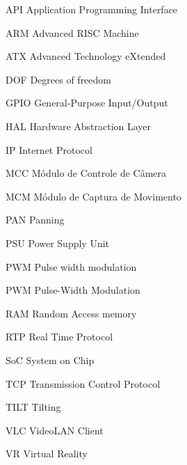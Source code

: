
\begin{siglas}
	\item[API]         Application Programming Interface
	\item[ARM]         Advanced RISC Machine
	\item[ATX]         Advanced Technology eXtended
	\item[DOF]         Degrees of freedom
	\item[GPIO]        General-Purpose Input/Output
	\item[HAL]         Hardware Abstraction Layer
	\item[IP]          Internet Protocol
	\item[MCC]         Módulo de Controle de Câmera
	\item[MCM]         Módulo de Captura de Movimento
	\item[PAN]         Panning
	\item[PSU]         Power Supply Unit
	\item[PWM]         Pulse width modulation
	\item[PWM]         Pulse-Width Modulation
	\item[RAM]         Random Access memory
	\item[RTP]         Real Time Protocol
	\item[SoC]         System on Chip
	\item[TCP]         Transmission Control Protocol
	\item[TILT]        Tilting
	\item[VLC]         VideoLAN Client
	\item[VR]          Virtual Reality
\end{siglas}

